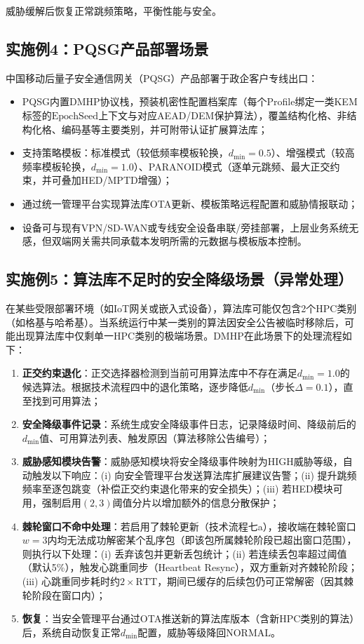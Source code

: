 ﻿\documentclass[12pt,a4paper]{article}
\begin{document}
威胁缓解后恢复正常跳频策略，平衡性能与安全。

\subsection*{实施例4：PQSG产品部署场景}

中国移动后量子安全通信网关（PQSG）产品部署于政企客户专线出口：

\begin{itemize}
    \item PQSG内置DMHP协议栈，预装机密性配置档案库（每个Profile绑定一类KEM标签的$\text{EpochSeed}$上下文与对应AEAD/DEM保护算法），覆盖结构化格、非结构化格、编码基等主要类别，并可附带认证扩展算法库；
    \item 支持策略模板：标准模式（较低频率模板轮换，$d_{\min}=0.5$）、增强模式（较高频率模板轮换，$d_{\min}=1.0$）、PARANOID模式（逐单元跳频、最大正交约束，并可叠加HED/MPTD增强）；
    \item 通过统一管理平台实现算法库OTA更新、模板策略远程配置和威胁情报联动；
    \item 设备可与现有VPN/SD-WAN或专线安全设备串联/旁挂部署，上层业务系统无感，但双端网关需共同承载本发明所需的元数据与模板版本控制。
\end{itemize}

\subsection*{实施例5：算法库不足时的安全降级场景（异常处理）}

在某些受限部署环境（如IoT网关或嵌入式设备），算法库可能仅包含2个HPC类别（如格基与哈希基）。当系统运行中某一类别的算法因安全公告被临时移除后，可能出现算法库中仅剩单一HPC类别的极端场景。DMHP在此场景下的处理流程如下：

\begin{enumerate}[label=\textbf{步骤\arabic*}：]
    \item \textbf{正交约束退化}：正交选择器检测到当前可用算法库中不存在满足$d_{\min}=1.0$的候选算法。根据技术流程四中的退化策略，逐步降低$d_{\min}$（步长$\Delta=0.1$），直至找到可用算法；
    \item \textbf{安全降级事件记录}：系统生成安全降级事件日志，记录降级时间、降级前后的$d_{\min}$值、可用算法列表、触发原因（算法移除公告编号）；
    \item \textbf{威胁感知模块告警}：威胁感知模块将安全降级事件映射为HIGH威胁等级，自动触发以下响应：(i) 向安全管理平台发送算法库扩展建议告警；(ii) 提升跳频频率至逐包跳变（补偿正交约束退化带来的安全损失）；(iii) 若HED模块可用，强制启用$(2,3)$阈值分片以增加额外的信息分散保护；
    \item \textbf{棘轮窗口不命中处理}：若启用了棘轮更新（技术流程七a），接收端在棘轮窗口$w=3$内均无法成功解密某个乱序包（即该包所属棘轮阶段已超出窗口范围），则执行以下处理：(i) 丢弃该包并更新丢包统计；(ii) 若连续丢包率超过阈值（默认5\%），触发心跳重同步（Heartbeat Resync），双方重新对齐棘轮阶段；(iii) 心跳重同步耗时约$2\times\text{RTT}$，期间已缓存的后续包仍可正常解密（因其棘轮阶段在窗口内）；
    \item \textbf{恢复}：当安全管理平台通过OTA推送新的算法库版本（含新HPC类别的算法）后，系统自动恢复正常$d_{\min}$配置，威胁等级降回NORMAL。
\end{enumerate}
\end{document}
